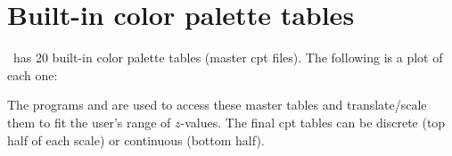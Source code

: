 %
%
\chapter{Built-in color palette tables}
\label{app:M}
\thispagestyle{headings}

\GMT\ has 20 built-in color palette tables (master cpt files).  The following is
a plot of each one: \\ 


The programs  and  are used to access these
master tables and translate/scale them to fit the user's range of $z$-values.
The final cpt tables can be discrete (top half of each scale) or continuous
(bottom half).
